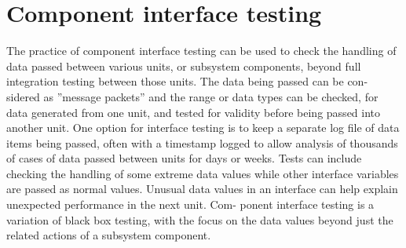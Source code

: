 \section{Component interface testing}
The practice of component interface testing can be used to check the handling of data passed between various units, or subsystem components, beyond full integration testing between those units. The data being passed can be con- sidered as ”message packets” and the range or data types can be checked, for data generated from one unit, and tested for validity before being passed into another unit. One option for interface testing is to keep a separate log file of data items being passed, often with a timestamp logged to allow analysis of thousands of cases of data passed between units for days or weeks. Tests can include checking the handling of some extreme data values while other interface variables are passed as normal values. Unusual data values in an interface can help explain unexpected performance in the next unit. Com- ponent interface testing is a variation of black box testing, with the focus on the data values beyond just the related actions of a subsystem component.

